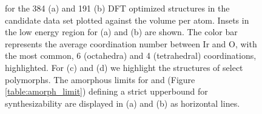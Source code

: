 \begin{figure}[!htb]
\centering
{}
\caption{\label{fig:E_vs_V}
%
\DHf for the \num{384} \IrOtwo (a) and \num{191} \IrOthree (b) DFT optimized structures in the candidate data set plotted against the volume per atom.
%
Insets in the low energy region for (a) and (b) are shown.
%
The color bar represents the average coordination number between Ir and O, with the most common, \num{6} (octahedra) and \num{4} (tetrahedral) coordinations, highlighted.
%
For \IrOtwo (c) and \IrOthree (d) we highlight the structures of select polymorphs.
%
The amorphous limits for \IrOtwo and \IrOthree (Figure \ref{table:amorph_limit}) defining a strict upperbound for synthesizability are displayed in (a) and (b) as horizontal lines.
}
\end{figure}


